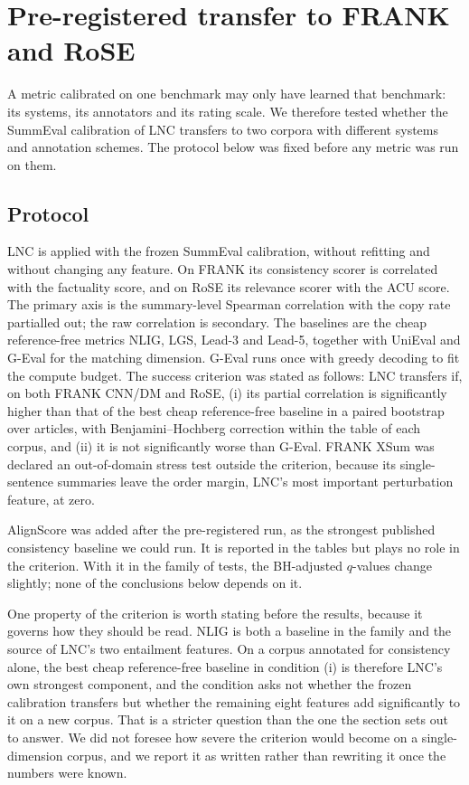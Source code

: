 \section{Pre-registered transfer to FRANK and RoSE}
\label{sec:transfer}

A metric calibrated on one benchmark may only have learned that benchmark: its systems, its annotators and its rating scale. We therefore tested whether the SummEval calibration of LNC transfers to two corpora with different systems and annotation schemes. The protocol below was fixed before any metric was run on them.

\subsection{Protocol}

LNC is applied with the frozen SummEval calibration, without refitting and without changing any feature. On FRANK its consistency scorer is correlated with the factuality score, and on RoSE its relevance scorer with the ACU score. The primary axis is the summary-level Spearman correlation with the copy rate partialled out; the raw correlation is secondary. The baselines are the cheap reference-free metrics NLIG, LGS, Lead-3 and Lead-5, together with UniEval and G-Eval for the matching dimension. G-Eval runs once with greedy decoding to fit the compute budget. The success criterion was stated as follows: LNC transfers if, on both FRANK CNN/DM and RoSE, (i) its partial correlation is significantly higher than that of the best cheap reference-free baseline in a paired bootstrap over articles, with Benjamini--Hochberg correction within the table of each corpus, and (ii) it is not significantly worse than G-Eval. FRANK XSum was declared an out-of-domain stress test outside the criterion, because its single-sentence summaries leave the order margin, LNC's most important perturbation feature, at zero.

AlignScore was added after the pre-registered run, as the strongest published consistency baseline we could run. It is reported in the tables but plays no role in the criterion. With it in the family of tests, the BH-adjusted $q$-values change slightly; none of the conclusions below depends on it.

One property of the criterion is worth stating before the results, because it governs how they should be read. NLIG is both a baseline in the family and the source of LNC's two entailment features. On a corpus annotated for consistency alone, the best cheap reference-free baseline in condition (i) is therefore LNC's own strongest component, and the condition asks not whether the frozen calibration transfers but whether the remaining eight features add significantly to it on a new corpus. That is a stricter question than the one the section sets out to answer. We did not foresee how severe the criterion would become on a single-dimension corpus, and we report it as written rather than rewriting it once the numbers were known.

